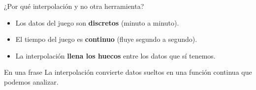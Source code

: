 \begin{frame}{¿Por qué interpolación y no otra herramienta?}
  \begin{itemize}
    \item Los datos del juego son \textbf{discretos} (minuto a minuto).
    \item El tiempo del juego es \textbf{continuo} (fluye segundo a segundo).
    \item La interpolación \textbf{llena los huecos} entre los datos que sí tenemos.
  \end{itemize}
  \vspace{0.8em}
  \begin{block}{En una frase}
    La interpolación convierte datos sueltos en una función continua que podemos analizar.
  \end{block}
\end{frame}